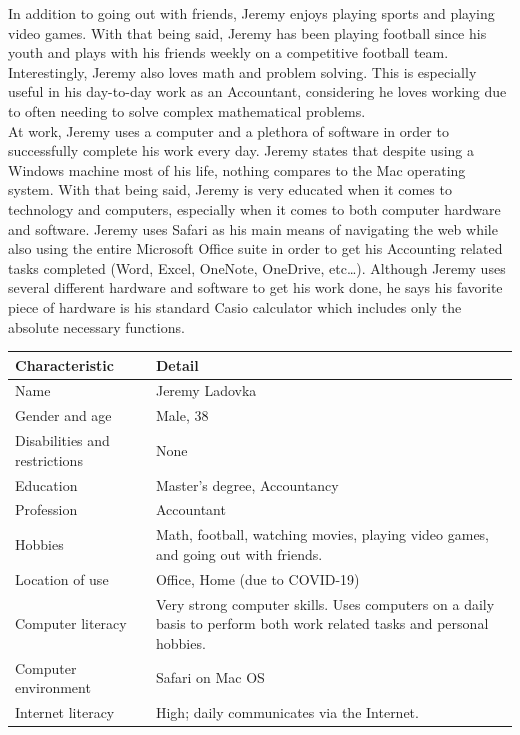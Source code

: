 \documentclass[11pt,onside]{report}
\begin{document}
In addition to going out with friends, Jeremy enjoys playing sports and playing video games. With that being said, Jeremy has been playing football since his youth and plays with his friends weekly on a competitive football team. Interestingly, Jeremy also loves math and problem solving. This is especially useful in his day-to-day work as an Accountant, considering he loves working due to often needing to solve complex mathematical problems. \\

At work, Jeremy uses a computer and a plethora of software in order to successfully complete his work every day. Jeremy states that despite using a Windows machine most of his life, nothing compares to the Mac operating system. With that being said, Jeremy is very educated when it comes to technology and computers, especially when it comes to both computer hardware and software. Jeremy uses Safari as his main means of navigating the web while also using the entire Microsoft Office suite in order to get his Accounting related tasks completed (Word, Excel, OneNote, OneDrive, etc…). Although Jeremy uses several different hardware and software to get his work done, he says his favorite piece of hardware is his standard Casio calculator which includes only the absolute necessary functions.
\begin{center}
    \begin{tabular}{|p{4cm}|p{10cm}|}
        \hline
        \bf{Characteristic} & \bf{Detail} \\
        \hline
        Name &   Jeremy Ladovka \\
        \hline
        Gender and age & Male, 38 \\
        \hline
        Disabilities and restrictions &  None \\
        \hline
        Education & Master's degree, Accountancy \\
        \hline
        Profession & Accountant \\
        \hline
        Hobbies & Math, football, watching movies, playing video games, and going out with friends. \\
        \hline
        Location of use & Office, Home (due to COVID-19) \\
        \hline
        Computer literacy & Very strong computer skills. Uses computers on a daily basis to perform both work related tasks and personal hobbies. \\
        \hline
        Computer environment & Safari on Mac OS \\
        \hline
        Internet literacy &  High; daily communicates via the Internet. \\
        \hline
    \end{tabular}
\end{center}
\end{document}
